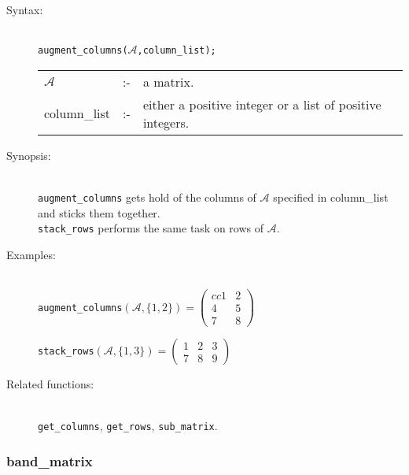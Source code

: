 \begin{description}
\item[Syntax:]\mbox{}\\
 \texttt{augment\_columns($\mathcal{A}$,column\_list);}\\[2mm]
\begin{tabular}{l l l}
$\mathcal{A}$  &:-& a matrix. \\
column\_list &:-&  either a positive integer or a list of positive
                   integers.
\end{tabular}

\item[Synopsis:]\mbox{}\\
\texttt{augment\_columns} gets hold of the columns of $\mathcal{A}$ specified
in column\_list and sticks them together. \\
\texttt{stack\_rows} performs the same task on rows of
                $\mathcal{A}$.

\item[Examples:]\mbox{}\\
  \texttt{augment\_columns}\((\mathcal{A},\{1,2\})  =
  \begin{pmatrix}{cc} 1 & 2 \\ 4 & 5 \\ 7 & 8  \end{pmatrix}\)

  \texttt{stack\_rows}\((\mathcal{A},\{1,3\})  =
  \begin{pmatrix} 1 & 2 & 3 \\ 7 & 8 & 9 \end{pmatrix}\)

\item[Related functions:]\mbox{}\\
\texttt{get\_columns}, \texttt{get\_rows},
\texttt{sub\_matrix}.
\end{description}


\subsubsection{band\_matrix}
\label{linalg:band_matrix}
\hypertarget{operator:BAND_MATRIX}{}

